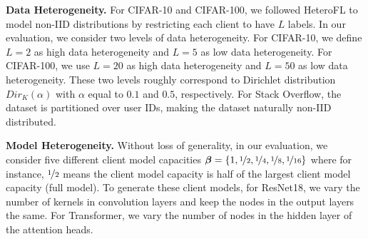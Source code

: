 \documentclass{article}
\begin{document}



\textbf{Data Heterogeneity.}
For CIFAR-10 and CIFAR-100, we followed HeteroFL \citep{diao2020heterofl} to model non-IID distributions by restricting each client to have $L$ labels. 
%
In our evaluation, we consider two levels of data heterogeneity. For CIFAR-10, we define $L=2$ as high data heterogeneity and $L=5$ as low data heterogeneity. For CIFAR-100, we use $L=20$ as high data heterogeneity and $L=50$ as low data heterogeneity. These two levels roughly correspond to Dirichlet distribution $Dir_K(\alpha)$ with $\alpha$ equal to $0.1$ and $0.5$, respectively.
%
For Stack Overflow, the dataset is partitioned over user IDs, making the dataset naturally non-IID distributed. 

\textbf{Model Heterogeneity.}
Without loss of generality, in our evaluation, we consider five different client model capacities $\boldsymbol{\beta}=\{1, \nicefrac{1}{2}, \nicefrac{1}{4}, \nicefrac{1}{8}, \nicefrac{1}{16}\}$ where for instance, $\nicefrac{1}{2}$ means the client model capacity is half of the largest client model capacity (full model).
%
To generate these client models, for ResNet18, we vary the number of kernels in convolution layers and keep the nodes in the output layers the same.
%
For Transformer, we vary the number of nodes in the hidden layer of the attention heads. 
\end{document}
